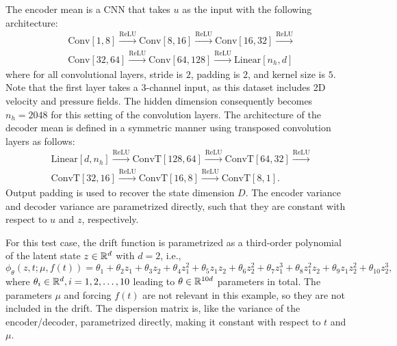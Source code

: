 \documentclass{article}
\begin{document}
	The encoder mean is a CNN that takes ${u}$ as the input with the following architecture:
	\begin{equation*}
		\begin{aligned}
			& \textrm{Conv}[1, 8] \xrightarrow{\text{ReLU}} \textrm{Conv}[8, 16] \xrightarrow{\text{ReLU}} \textrm{Conv}[16, 32] \xrightarrow{\text{ReLU}} \\
			& \textrm{Conv}[32, 64] \xrightarrow{\text{ReLU}} \textrm{Conv}[64, 128] \xrightarrow{\text{ReLU}} \textrm{Linear}[n_h, d]
		\end{aligned}
	\end{equation*}
	where for all convolutional layers, stride is $2$, padding is $2$, and kernel size is $5$. Note that the first layer takes a $3$-channel input, as this dataset includes 2D velocity and pressure fields. The hidden dimension consequently becomes $n_h = 2048$ for this setting of the convolution layers. The architecture of the decoder mean  is defined in a symmetric manner using transposed convolution layers as follows:
	\begin{equation*}
		\begin{aligned}
			& \textrm{Linear}[d, n_h] \xrightarrow{\text{ReLU}} \textrm{ConvT}[128, 64] \xrightarrow{\text{ReLU}} \textrm{ConvT}[64, 32] \xrightarrow{\text{ReLU}} \\
			& \textrm{ConvT}[32, 16] \xrightarrow{\text{ReLU}} \textrm{ConvT}[16, 8] \xrightarrow{\text{ReLU}} \textrm{ConvT}[8, 1].
		\end{aligned}
	\end{equation*}
	Output padding is used to recover the state dimension $D$. The encoder variance and decoder variance are parametrized directly, such that they are constant with respect to $u$ and $z$, respectively.
	
	For this test case, the drift function is parametrized as a third-order polynomial of the latent state $z \in \mathbb{R}^{d}$  with $d=2$, i.e., 
	\begin{equation*}
		\phi_{\theta}(z, t; \mu, f(t)) = \theta_1 + \theta_2 z_1 + \theta_3 z_2 + \theta_4 z_1^2 + \theta_5 z_1 z_2 + \theta_6 z_2^2 + \theta_7 z_1^3 + \theta_8 z_1^2 z_2 + \theta_9 z_1 z_2^2 + \theta_{10} z_2^3,
	\end{equation*}
	where $\theta_i \in \mathbb{R}^{d}, i=1,2,\ldots,10$ leading to $\theta \in \mathbb{R}^{10d}$ parameters in total. The parameters $\mu$ and forcing $f(t)$ are not relevant in this example, so they are not included in the drift. The dispersion matrix is, like the variance of the encoder/decoder, parametrized directly, making it constant with respect to $t$ and $\mu$.
	
\end{document}
